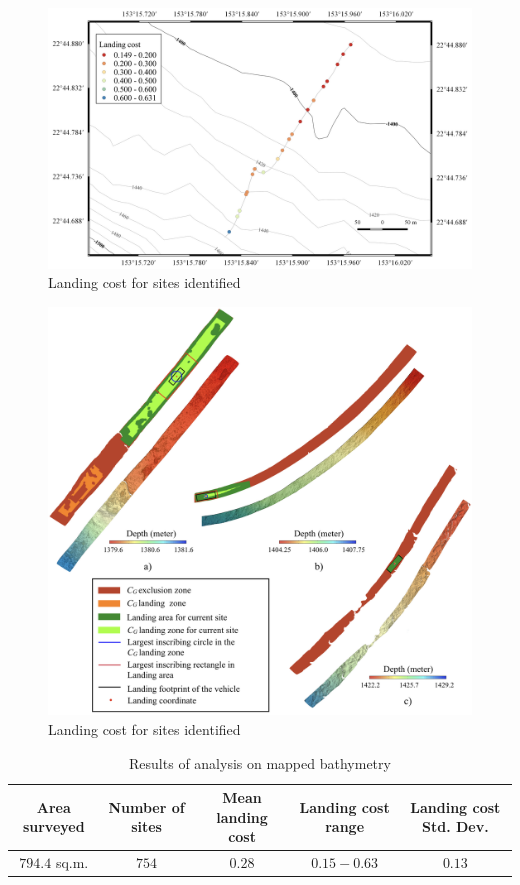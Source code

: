 \begin{figure}[!ht]
\centering
\includegraphics[width=6in]{./images/mehul27.png}
\caption{Landing cost for sites identified}
\label{f:mehul27}
\end{figure}


\begin{figure}[!ht]
\centering
\includegraphics[width=\textwidth]{./images/mehul28.png}
\caption{Landing cost for sites identified}
\label{f:mehul28}
\end{figure}

\begin{table}[!ht]
\centering
\caption{Results of analysis on mapped bathymetry}
\begin{tabular}{  |c c c c c|}
\hline
\textbf{Area surveyed} & \textbf{Number of sites} & \textbf{Mean landing cost} & \textbf{Landing cost range} & \textbf{Landing cost Std. Dev.}\\ \hline 
$794.4$ sq.m. & $754$ & $0.28$ & $0.15 - 0.63$ & $0.13$ \\
\hline
\end{tabular}
\label{t:table6}
\end{table}
